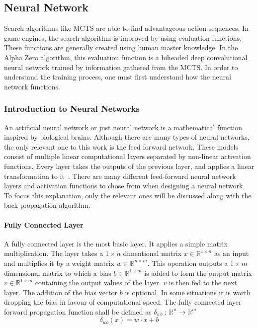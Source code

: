\documentclass[12pt]{article}
\begin{document}
\subsection{Neural Network}
Search algorithms like MCTS are able to find advantageous action sequences. In game engines, the search algorithm is improved by using evaluation functions. These functions are generally created using human master knowledge. In the Alpha Zero algorithm, this evaluation function is a biheaded deep convolutional neural network trained by information gathered from the MCTS. In order to understand the training process, one must first understand how the neural network functions.
\label{NN}
\subsubsection{Introduction to Neural Networks}
An artificial neural network or just neural network is a mathematical function inspired by biological brains. Although there are many types of neural networks, the only relevant one to this work is the feed forward network. These models consist of multiple linear computational layers separated by non-linear activation functions. Every layer takes the outputs of the previous layer, and applies a linear transformation to it~\cite{zhang2018artificial}. There are many different feed-forward neural network layers and activation functions to chose from when designing a neural network. To focus this explanation, only the relevant ones will be discussed along with the back-propagation algorithm.
\paragraph{Fully Connected Layer}
A fully connected layer is the most basic layer. It applies a simple matrix multiplication. The layer takes a \(1 \times n\) dimentional matrix \(x \in \mathbb{R}^{1\times n}\) as an input and multiplies it by a weight matrix \(w \in\mathbb{R}^{n\times m}\). This operation outputs a \(1\times m\) dimensional matrix to which a bias \(b \in \mathbb{R}^{1 \times m}\) is added to form the output matrix \(v \in \mathbb{R}^{1 \times m}\) containing the output values of the layer. \(v\) is then fed to the next layer. The addition of the bias vector \(b\) is optional. In some situations it is worth dropping the bias in favour of computational speed. The fully connected layer forward propagation function shall be defined as \(\delta_{wb}~:~\mathbb{R}^n\to\mathbb{R}^m\)
\begin{equation} \label{eq:NN:fully_connected_layer_forward}
\delta_{wb}(x) = w \cdot x + b
\end{equation}
\end{document}
